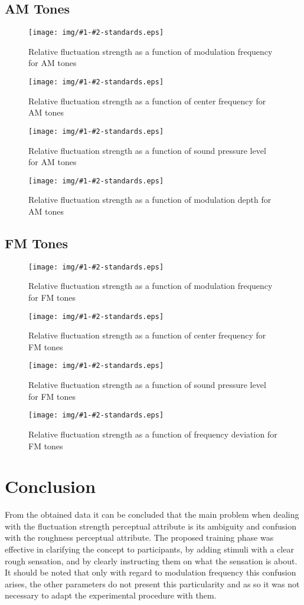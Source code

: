 \documentclass[a4paper]{article}
\newcommand{\figStds}[3]{
\begin{figure}[ht!]
  \centering
  \texttt{[image: img/\#1-\#2-standards.eps]}
  \caption{#3}
\label{fig:#1-#2}
\end{figure}
}
\begin{document}
\subsection{AM Tones} %
\label{subsec:results_am_tones}

\figStds{AM-fm}
  {All}
  {Relative fluctuation strength as a function of modulation frequency for AM
  tones}

\figStds{AM-fc}
  {All}
  {Relative fluctuation strength as a function of center frequency for AM
  tones}

\figStds{AM-SPL}
  {All}
  {Relative fluctuation strength as a function of sound pressure level for AM
  tones}

\figStds{AM-md}
  {All}
  {Relative fluctuation strength as a function of modulation depth for AM
  tones}


\subsection{FM Tones} %
\label{subsec:results_fm_tones}

\figStds{FM-fm}
  {All}
  {Relative fluctuation strength as a function of modulation frequency for FM
  tones}

\figStds{FM-fc}
  {All}
  {Relative fluctuation strength as a function of center frequency for FM
  tones}

\figStds{FM-SPL}
  {All}
  {Relative fluctuation strength as a function of sound pressure level for FM
  tones}

\figStds{FM-df}
  {All}
  {Relative fluctuation strength as a function of frequency deviation for FM
  tones}



\section{Conclusion} %
\label{sec:conclusion}

From the obtained data it can be concluded that the main problem when dealing
with the fluctuation strength perceptual attribute is its ambiguity and
confusion with the roughness perceptual attribute. The proposed training phase
was effective in clarifying the concept to participants, by adding stimuli with
a clear rough sensation, and by clearly instructing them on what the sensation
is about. It should be noted that only with regard to modulation frequency this
confusion arises, the other parameters do not present this particularity and as
so it was not necessary to adapt the experimental procedure with them.
\end{document}
